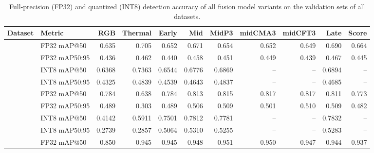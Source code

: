 \documentclass[12pt,oneside,bibtotoc,liststotoc]{scrbook}
\begin{document}
\begin{table}[H]
    \centering
    \caption{Full-precision (FP32) and quantized (INT8) detection accuracy of all fusion
        model variants on the validation sets of all datasets.}
    \label{tab:acc_full_precision}
    \begin{adjustbox}{max width=\textwidth}
        \begin{tabular}{|l l r r r r r r r r r|}
            \toprule
            \rowcolor{white}
            \textbf{Dataset} & \textbf{Metric}
                             & \textbf{RGB}     & \textbf{Thermal} & \textbf{Early}
                             & \textbf{Mid}     & \textbf{MidP3}   & \textbf{midCMA3}
                             & \textbf{midCFT3} & \textbf{Late}    & \textbf{Score}                                                               \\
            \midrule
            \rowcolor{rowlight}      & FP32 mAP@50      & 0.635            & 0.705            & 0.652  & 0.671  & 0.654  & 0.652 & 0.649 & 0.690  & 0.664 \\
            \rowcolor{rowlight}      & FP32 mAP50:95    & 0.436            & 0.462            & 0.440  & 0.458  & 0.451  & 0.449 & 0.439 & 0.467  & 0.445 \\
            \cmidrule{2-11}
            \rowcolor{rowlight}      & INT8 mAP@50      & 0.6368           & 0.7363           & 0.6544 & 0.6776 & 0.6869 & --    & --    & 0.6894 & --    \\
            \rowcolor{rowlight} \multirow{-4}{*}{M3FD} & INT8 mAP50:95 & 0.4325 & 0.4839 & 0.4539 & 0.4643 & 0.4837 & --    & --    & 0.4685 & --    \\
            \midrule
            \rowcolor{rowdark}       & FP32 mAP@50      & 0.784            & 0.638            & 0.784  & 0.813  & 0.815  & 0.817 & 0.817 & 0.811  & 0.773 \\
            \rowcolor{rowdark}       & FP32 mAP50:95    & 0.489            & 0.303            & 0.489  & 0.506  & 0.509  & 0.501 & 0.510 & 0.509  & 0.482 \\
            \cmidrule{2-11}
            \rowcolor{rowdark}       & INT8 mAP@50      & 0.4142           & 0.5911           & 0.7501 & 0.7812 & 0.7781 & --    & --    & 0.7832 & --    \\
            \rowcolor{rowdark} \multirow{-4}{*}{RTDOD} & INT8 mAP50:95 & 0.2739 & 0.2857 & 0.5064 & 0.5310 & 0.5255 & --    & --    & 0.5283 & --    \\
            \midrule
            \rowcolor{rowlight}      & FP32 mAP@50      & 0.850            & 0.945            & 0.945  & 0.948  & 0.951  & 0.950 & 0.947 & 0.944  & 0.937 \\

\end{tabular}
\end{adjustbox}
\end{table}
\end{document}
